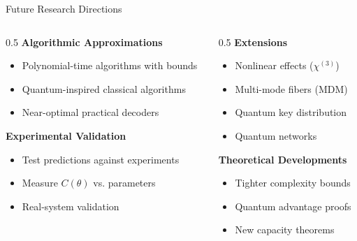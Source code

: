\documentclass[10pt]{beamer}
\begin{document}
\begin{frame}{Future Research Directions}
\begin{columns}
\begin{column}{0.5\textwidth}
\textbf{Algorithmic Approximations}
\begin{itemize}
\item Polynomial-time algorithms with bounds
\item Quantum-inspired classical algorithms
\item Near-optimal practical decoders
\end{itemize}

\textbf{Experimental Validation}
\begin{itemize}
\item Test predictions against experiments
\item Measure $C(\theta)$ vs. parameters
\item Real-system validation
\end{itemize}
\end{column}

\begin{column}{0.5\textwidth}
\textbf{Extensions}
\begin{itemize}
\item Nonlinear effects ($\chi^{(3)}$)
\item Multi-mode fibers (MDM)
\item Quantum key distribution
\item Quantum networks
\end{itemize}

\textbf{Theoretical Developments}
\begin{itemize}
\item Tighter complexity bounds
\item Quantum advantage proofs
\item New capacity theorems
\end{itemize}
\end{column}
\end{columns}
\end{frame}
\end{document}
